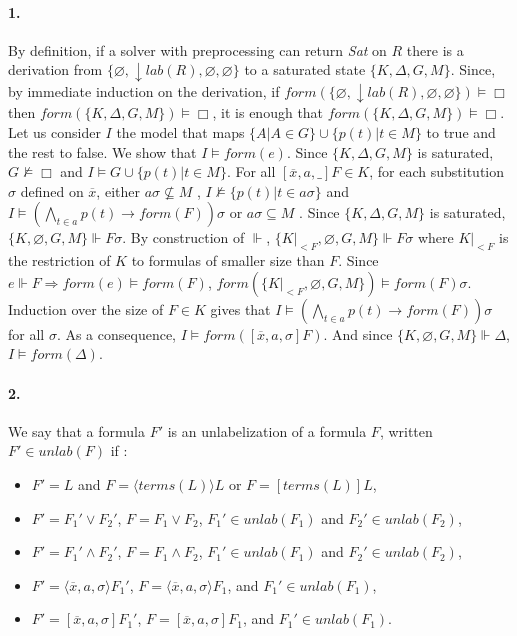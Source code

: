 \documentclass[a4paper,10pt]{report}
\newcommand{\terms}{\mathit{terms}}
\newcommand{\F}{\mathit{form}}
\newcommand{\T}{\mathit{lab}}
\newcommand{\unlab}{\mathit{unlab}}
\begin{document}
\paragraph{1.} By definition, if a solver with preprocessing can return \emph{Sat} on $R$ there is a
derivation from $\{\varnothing, \downarrow\T(R), \varnothing, \varnothing\}$ to a saturated state
$\{K, \Delta, G, M\}$. Since, by immediate induction on the derivation, if
$\F(\{\varnothing, \downarrow\T(R), \varnothing, \varnothing\})\vDash\Box$ then
$\F(\{K, \Delta, G, M \})\vDash\Box$, it is enough that $\F(\{K, \Delta, G, M\})\vDash\Box$. Let
us consider $I$ the model that maps $\{A|A\in G\}\cup\{p(t)|t\in M\}$ to true and the rest to false.
We show that $I\vDash\F(e)$. Since $\{K,\Delta, G, M\}$ is saturated, $G\nvDash\Box$
and $I\vDash G\cup\{p(t)|t\in M\}$. For all $[\overline x, a,\_]F\in K$, for
each substitution $\sigma$ defined on $\overline x$, either $a\sigma\nsubseteq M$ ,
$I\nvDash\{p(t)|t\in a\sigma\}$ and $I\vDash(\bigwedge_{t\in a} p(t)\rightarrow\F(F))\sigma$ or
$a\sigma\subseteq M$ . Since $\{K,\Delta, G, M\}$ is saturated, $\{K, \varnothing, G, M\}\Vdash F\sigma$.
By construction of $\Vdash$, $\{K|_{<F} ,\varnothing, G, M\}\Vdash F\sigma$ where $K|_{<F}$ is the
restriction of $K$ to formulas of smaller size than $F$. Since $e\Vdash F\Rightarrow\F(e)\vDash\F(F)$,
$\F(\{K|_{<F} ,\varnothing, G, M\})\vDash\F(F)\sigma$. Induction over the size of $F\in K$
gives that $I\vDash(\bigwedge_{t\in a}p(t)\rightarrow\F(F))\sigma$ for all $\sigma$.
As a consequence, $I\vDash\F([\overline x, a,\sigma]F )$. And since
$\{K, \varnothing, G, M\}\Vdash\Delta$, $I\vDash\F(\Delta)$.
\paragraph{2.}
We say that a formula $F'$ is an unlabelization of a formula $F$, written $F'\in\unlab(F)$ if :
\begin{itemize}
 \item $F'= L$ and $F =\langle\terms(L)\rangle L$ or $F = [\terms(L)]L$,
 \item $F'= F_1'\vee F_2'$, $F = F_1\vee F_2$, $F_1'\in\unlab(F_1)$ and $F_2'\in\unlab(F_2)$,
 \item $F'= F_1'\wedge F_2'$, $F = F_1\wedge F_2$, $F_1'\in\unlab(F_1)$ and $F_2'\in\unlab(F_2)$,
 \item $F'=\langle\overline x, a,\sigma\rangle F_1'$, $F =\langle\overline x, a,\sigma\rangle F_1$,
and $F_1'\in\unlab(F_1)$,
 \item $F' = [\overline x, a,\sigma]F_1'$, $F = [\overline x, a,\sigma]F_1$,
and $F_1'\in\unlab(F_1)$.
\end{itemize}
\end{document}
